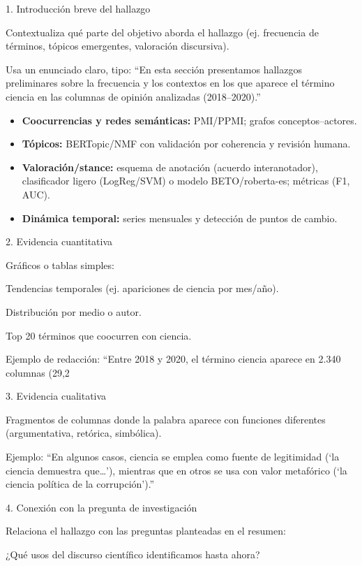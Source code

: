 	1. Introducción breve del hallazgo

Contextualiza qué parte del objetivo aborda el hallazgo (ej. frecuencia de términos, tópicos emergentes, valoración discursiva).

Usa un enunciado claro, tipo:
“En esta sección presentamos hallazgos preliminares sobre la frecuencia y los contextos en los que aparece el término ciencia en las columnas de opinión analizadas (2018–2020).”

\begin{itemize}
	\item \textbf{Coocurrencias y redes semánticas:} PMI/PPMI; grafos conceptos–actores.
	\item \textbf{Tópicos:} BERTopic/NMF con validación por coherencia y revisión humana.
	\item \textbf{Valoración/stance:} esquema de anotación (acuerdo interanotador), clasificador ligero (LogReg/SVM) o modelo BETO/roberta-es; métricas (F1, AUC).
	\item \textbf{Dinámica temporal:} series mensuales y detección de puntos de cambio.
\end{itemize}

2. Evidencia cuantitativa

Gráficos o tablas simples:

Tendencias temporales (ej. apariciones de ciencia por mes/año).

Distribución por medio o autor.

Top 20 términos que coocurren con ciencia.

Ejemplo de redacción:
“Entre 2018 y 2020, el término ciencia aparece en 2.340 columnas (29,2%

3. Evidencia cualitativa

Fragmentos de columnas donde la palabra aparece con funciones diferentes (argumentativa, retórica, simbólica).

Ejemplo:
“En algunos casos, ciencia se emplea como fuente de legitimidad (‘la ciencia demuestra que…’), mientras que en otros se usa con valor metafórico (‘la ciencia política de la corrupción’).”

4. Conexión con la pregunta de investigación

Relaciona el hallazgo con las preguntas planteadas en el resumen:

¿Qué usos del discurso científico identificamos hasta ahora?

